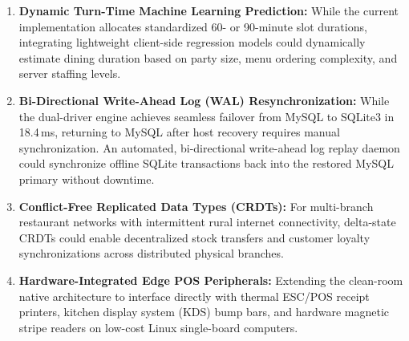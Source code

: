 \begin{enumerate}
    \item \textbf{Dynamic Turn-Time Machine Learning Prediction:} While the current implementation allocates standardized 60- or 90-minute slot durations, integrating lightweight client-side regression models could dynamically estimate dining duration based on party size, menu ordering complexity, and server staffing levels.
    \item \textbf{Bi-Directional Write-Ahead Log (WAL) Resynchronization:} While the dual-driver engine achieves seamless failover from MySQL to SQLite3 in 18.4\,ms, returning to MySQL after host recovery requires manual synchronization. An automated, bi-directional write-ahead log replay daemon could synchronize offline SQLite transactions back into the restored MySQL primary without downtime.
    \item \textbf{Conflict-Free Replicated Data Types (CRDTs):} For multi-branch restaurant networks with intermittent rural internet connectivity, delta-state CRDTs could enable decentralized stock transfers and customer loyalty synchronizations across distributed physical branches.
    \item \textbf{Hardware-Integrated Edge POS Peripherals:} Extending the clean-room native architecture to interface directly with thermal ESC/POS receipt printers, kitchen display system (KDS) bump bars, and hardware magnetic stripe readers on low-cost Linux single-board computers.
\end{enumerate}
